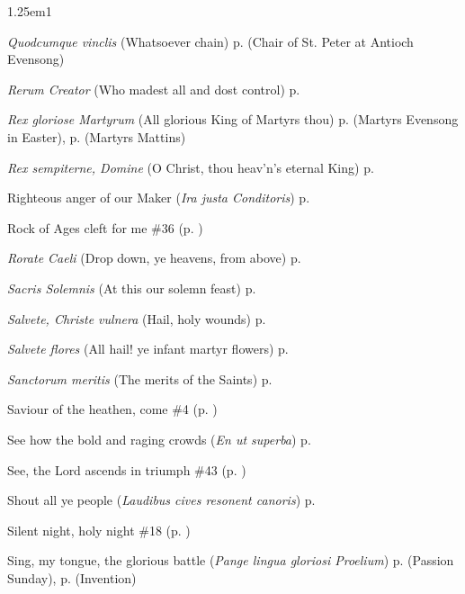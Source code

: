 \begin{hangparas}{1.25em}{1}
\par\noindent
\textit{Quodcumque vinclis} (Whatsoever chain) \dotfill p. \pageref{PeterAntiochEvensong} (Chair of St. Peter at Antioch Evensong)
\par\noindent
\textit{Rerum Creator} (Who madest all and dost control) \dotfill p. \pageref{WednesdayInvitatory}
\par\noindent
\textit{Rex gloriose Martyrum} (All glorious King of Martyrs thou) \dotfill p. \pageref{MartyrsEvensongEaster} (Martyrs Evensong in Easter), p. \pageref{MartyrsMattins} (Martyrs Mattins)
\par\noindent
\textit{Rex sempiterne, Domine} (O Christ, thou heav'n's eternal King) \dotfill p. \pageref{EasterDayInvitatory}
\par\noindent
Righteous anger of our Maker (\textit{Ira justa Conditoris}) \dotfill p. \pageref{PreciousBloodInvitatory}
\par\noindent
Rock of Ages cleft for me \dotfill \#36 (p. \pageref{Hymn36})
\par\noindent
\textit{Rorate Caeli} (Drop down, ye heavens, from above) \dotfill p. \pageref{AdventProse}
\par\noindent
\textit{Sacris Solemnis} (At this our solemn feast) \dotfill p. \pageref{CorpusChristiInvitatory}
\par\noindent
\textit{Salvete, Christe vulnera} (Hail, holy wounds) \dotfill p. \pageref{PreciousBloodMattins}
\par\noindent
\textit{Salvete flores} (All hail! ye infant martyr flowers) \dotfill p. \pageref{HolyInnocentsMattinsHymn}
\par\noindent
\textit{Sanctorum meritis} (The merits of the Saints) \dotfill p. \pageref{MartyrsEvensong}
\par\noindent
Saviour of the heathen, come \dotfill \#4 (p. \pageref{Hymn4})
\par\noindent
See how the bold and raging crowds (\textit{En ut superba}) \dotfill p. \pageref{CompassionInvitatory}
\par\noindent
See, the Lord ascends in triumph \dotfill \#43 (p. \pageref{Hymn43})
\par\noindent
Shout all ye people (\textit{Laudibus cives resonent canoris}) \dotfill p. \pageref{BenedictEvensong}
\par\noindent
Silent night, holy night \dotfill \#18 (p. \pageref{Hymn18})
\par\noindent
Sing, my tongue, the glorious battle (\textit{Pange lingua gloriosi Proelium}) \dotfill p. \pageref{PassionInvitatoryHymn} (Passion Sunday), p. \pageref{InventionInvitatory} (Invention)

\end{hangparas}
